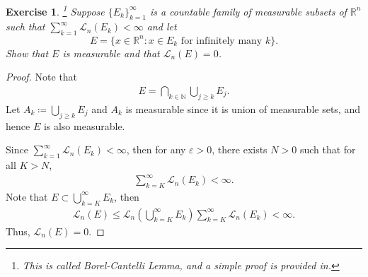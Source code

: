 \documentclass[11pt]{book}
\newtheorem{exercise}{Exercise}[chapter]
\theoremstyle{definition}
\numberwithin{equation}{chapter}
\begin{document}
\begin{exercise}\footnote{This is called Borel-Cantelli Lemma, and a simple proof is provided in\cite{22}.}
Suppose $\{E_k\}^\infty_{k=1}$ is a countable family of measurable subsets of $\mathbb{R}^n$ such that
$\sum^\infty_{k=1} \mathcal{L}_n(E_k)<\infty$ and let
$$
E=\{ x\in\mathbb{R}^n:x\in E_k\text{ for infinitely many }k\}.
$$
Show that $E$ is measurable and that $\mathcal{L}_n(E)=0$.
\end{exercise}
\begin{proof}
Note that 
\begin{align*}
    E = \bigcap_{k\in \mathbb{N}} \bigcup_{j\geq k} E_j.
\end{align*}
Let $A_k \coloneqq \bigcup_{j\geq k} E_j$ and $A_k$ is measurable since it is union of measurable sets, and hence $E$ is also measurable.

Since $\sum^\infty_{k=1} \mathcal{L}_n(E_k) < \infty$, then for any $\varepsilon > 0$, there exists $N > 0$ such that for all $K > N$,
\begin{align*}
    \sum^\infty_{k=K} \mathcal{L}_n(E_k) < \infty.
\end{align*}
Note that $E \subset \bigcup^\infty_{k=K} E_k$, then
\begin{align*}
    \mathcal{L}_n(E) \leq \mathcal{L}_n\left(\bigcup^\infty_{k=K} E_k\right) \sum^\infty_{k=K} \mathcal{L}_n(E_k) < \infty.
\end{align*}
Thus, $\mathcal{L}_n(E)=0$.
\end{proof}

\medskip
\end{document}
